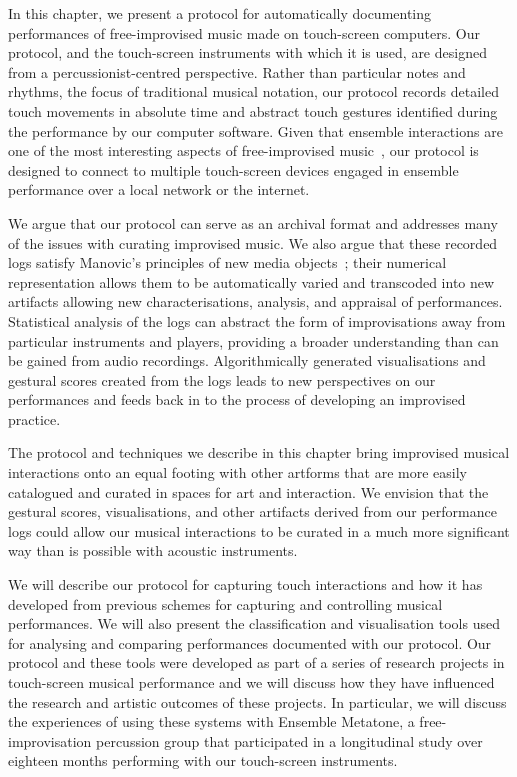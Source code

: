 \documentclass[graybox]{svmult}
\begin{document}
In this chapter, we present a protocol for automatically documenting
performances of free-improvised music made on touch-screen computers.
Our protocol, and the touch-screen instruments with which it is used,
are designed from a percussionist-centred perspective. Rather than
particular notes and rhythms, the focus of traditional musical
notation, our protocol records detailed touch movements in absolute
time and abstract touch gestures identified during the performance by
our computer software. Given that ensemble interactions are one of the
most interesting aspects of free-improvised music~\cite{Borgo:2006fv},
our protocol is designed to connect to multiple touch-screen devices
engaged in ensemble performance over a local network or the internet.

We argue that our protocol can serve as an archival format and
addresses many of the issues with curating improvised music. We also
argue that these recorded logs satisfy Manovic's principles of new
media objects~\cite{Manovich:2002ly}; their numerical representation
allows them to be automatically varied and transcoded into new
artifacts allowing new characterisations, analysis, and appraisal of
performances. Statistical analysis of the logs can abstract the form
of improvisations away from particular instruments and players,
providing a broader understanding than can be gained from audio
recordings. Algorithmically generated visualisations and gestural
scores created from the logs leads to new perspectives on our
performances and feeds back in to the process of developing an
improvised practice.

The protocol and techniques we describe in this chapter bring
improvised musical interactions onto an equal footing with other
artforms that are more easily catalogued and curated in spaces for art
and interaction. We envision that the gestural scores, visualisations,
and other artifacts derived from our performance logs could allow our
musical interactions to be curated in a much more significant way than
is possible with acoustic instruments.

We will describe our protocol for capturing touch interactions and how
it has developed from previous schemes for capturing and controlling
musical performances. We will also present the classification and
visualisation tools used for analysing and comparing performances
documented with our protocol. Our protocol and these tools were
developed as part of a series of research projects in touch-screen
musical performance and we will discuss how they have influenced the
research and artistic outcomes of these projects. In particular, we
will discuss the experiences of using these systems with Ensemble
Metatone, a free-improvisation percussion group that participated in a
longitudinal study over eighteen months performing with our
touch-screen instruments.
\end{document}

